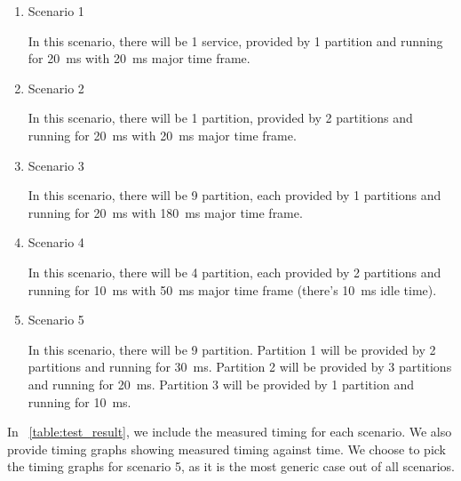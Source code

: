 \documentclass[conference]{IEEEtran}
\begin{document}
\begin{enumerate}
	\item Scenario 1

		In this scenario, there will be 1 service, provided by 1 partition and running for
		\SI{20}{\milli\second} with \SI{20}{\milli\second} major time frame.

	\item Scenario 2

		In this scenario, there will be 1 partition, provided by 2 partitions and running for
		\SI{20}{\milli\second} with \SI{20}{\milli\second} major time frame.

	\item Scenario 3

		In this scenario, there will be 9 partition, each provided by 1 partitions and running for
		\SI{20}{\milli\second} with \SI{180}{\milli\second} major time frame.

	\item Scenario 4

		In this scenario, there will be 4 partition, each provided by 2 partitions and running for
		\SI{10}{\milli\second} with \SI{50}{\milli\second} major time frame (there's
		\SI{10}{\milli\second} idle time).

	\item Scenario 5

		In this scenario, there will be 9 partition. Partition 1 will be provided by 2 partitions and running for
		\SI{30}{\milli\second}. Partition 2 will be provided by 3 partitions and running for
		\SI{20}{\milli\second}. Partition 3 will be provided by 1 partition and running for
		\SI{10}{\milli\second}.

\end{enumerate}

In \tablename ~\ref{table:test_result}, we include the measured timing for each scenario. We also provide
timing graphs showing measured timing against time. We choose to pick the timing graphs for
scenario 5, as it is the most generic case out of all scenarios.
\end{document}
